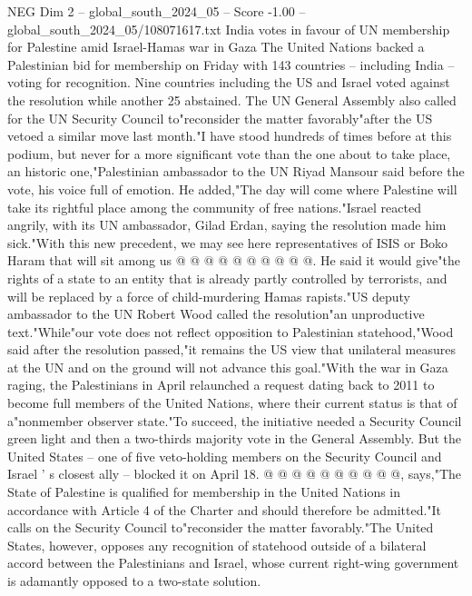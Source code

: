 \begin{textsample}{NEG Dim 2 – global\_south\_2024\_05 – Score -1.00 – global\_south\_2024\_05/108071617.txt}  \label{ex:f2_neg_369}
India votes in favour of UN membership for Palestine amid Israel-Hamas war in Gaza The United Nations backed a Palestinian bid for membership on Friday with 143 countries -- including India -- voting for recognition.
Nine countries including the US and Israel voted against the resolution while another 25 abstained.
The UN General Assembly also called for the UN Security Council to"reconsider the matter favorably"after the US vetoed a similar move last month."I have stood hundreds of times before at this podium, but never for a more significant vote than the one about to take place, an historic one,"Palestinian ambassador to the UN Riyad Mansour said before the vote, his voice full of emotion.
He added,"The day will come where Palestine will take its rightful place among the community of free nations."Israel reacted angrily, with its UN ambassador, Gilad Erdan, saying the resolution made him sick."With this new precedent, we may see here representatives of ISIS or Boko Haram that will sit among us @ @ @ @ @ @ @ @ @ @.
He said it would give"the rights of a state to an entity that is already partly controlled by terrorists, and will be replaced by a force of child-murdering Hamas rapists."US deputy ambassador to the UN Robert Wood called the resolution"an unproductive text."While"our vote does not reflect opposition to Palestinian statehood,"Wood said after the resolution passed,"it remains the US view that unilateral measures at the UN and on the ground will not advance this goal."With the war in Gaza raging, the Palestinians in April relaunched a request dating back to 2011 to become full members of the United Nations, where their current status is that of a"nonmember observer state."To succeed, the initiative needed a Security Council green light and then a two-thirds majority vote in the General Assembly.
But the United States -- one of five veto-holding members on the Security Council and Israel ' s closest ally -- blocked it on April 18. @ @ @ @ @ @ @ @ @ @, says,"The State of Palestine is qualified for membership in the United Nations in accordance with Article 4 of the Charter and should therefore be admitted."It calls on the Security Council to"reconsider the matter favorably."The United States, however, opposes any recognition of statehood outside of a bilateral accord between the Palestinians and Israel, whose current right-wing government is adamantly opposed to a two-state solution.

\end{textsample}
